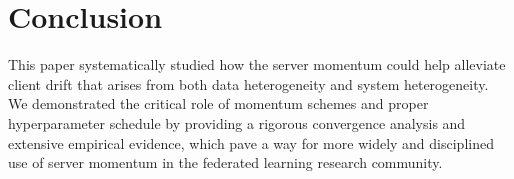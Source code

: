 \section{Conclusion}
\label{sec:conclusion}

This paper systematically studied how the server momentum could help alleviate client drift that arises from both data heterogeneity and system heterogeneity. We demonstrated the critical role of momentum schemes and proper hyperparameter schedule by providing a rigorous convergence analysis and extensive empirical evidence, which pave a way for more widely and disciplined use of server momentum in the federated learning research community. 